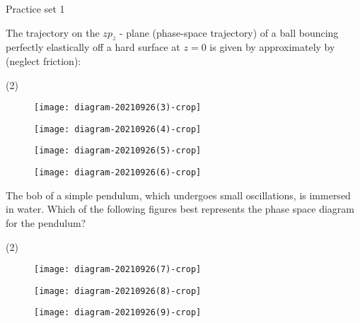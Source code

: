 \newpage
\begin{abox}
	Practice set 1 
	\end{abox}
\begin{enumerate}
\begin{minipage}{\textwidth}
	\item The trajectory on the $z p_{z}$ - plane (phase-space trajectory) of a ball bouncing perfectly elastically off a hard surface at $z=0$ is given by approximately by (neglect friction):
\end{minipage}
\begin{tasks}(2)
	\task[\textbf{A.}]\begin{figure}[H]
		\centering
		\texttt{[image: diagram-20210926(3)-crop]}
	\end{figure}
	\task[\textbf{B.}]\begin{figure}[H]
		\centering
		\texttt{[image: diagram-20210926(4)-crop]}
	\end{figure}
	\task[\textbf{C.}]\begin{figure}[H]
		\centering
		\texttt{[image: diagram-20210926(5)-crop]}
	\end{figure}
	\task[\textbf{D.}]\begin{figure}[H]
		\centering
		\texttt{[image: diagram-20210926(6)-crop]}
	\end{figure}
\end{tasks}
\begin{minipage}{\textwidth}
	\item The bob of a simple pendulum, which undergoes small oscillations, is immersed in water. Which of the following figures best represents the phase space diagram for the pendulum?
\end{minipage}
\begin{tasks}(2)
	\task[\textbf{A.}]\begin{figure}[H]
		\centering
		\texttt{[image: diagram-20210926(7)-crop]}
	\end{figure}
	\task[\textbf{B.}]\begin{figure}[H]
		\centering
		\texttt{[image: diagram-20210926(8)-crop]}
	\end{figure}
	\task[\textbf{C.}]\begin{figure}[H]
		\centering
		\texttt{[image: diagram-20210926(9)-crop]}
	\end{figure}
	\task[\textbf{D.}]\begin{figure}[H]

\end{figure}
\end{tasks}
\end{enumerate}
